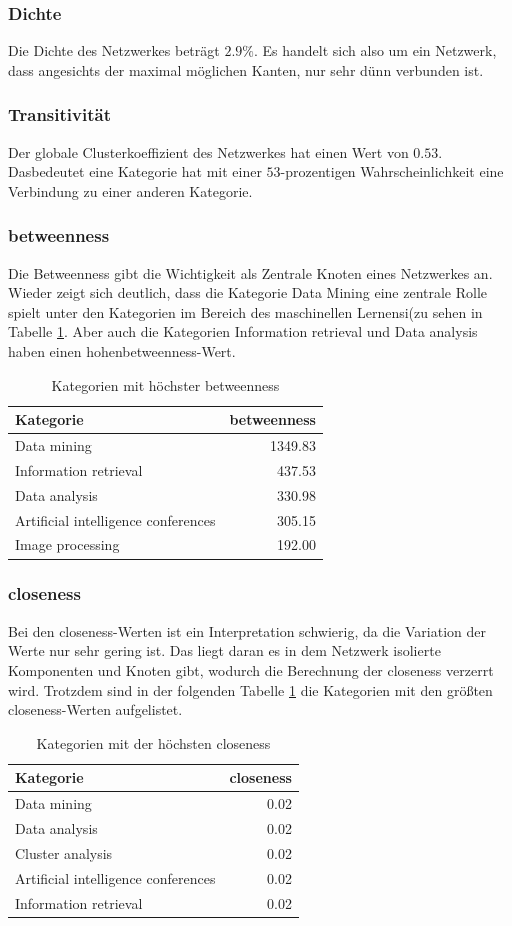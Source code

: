 \documentclass{acm_proc_article-sp}
\begin{document}
\subsubsection{Dichte}
Die Dichte des Netzwerkes beträgt $2.9\%$. Es handelt sich also um ein Netzwerk, dass angesichts der maximal möglichen Kanten, nur sehr dünn verbunden ist.
\subsubsection{Transitivität}
Der globale Clusterkoeffizient des Netzwerkes hat einen Wert von $0.53$. Dasbedeutet eine Kategorie hat mit einer $53$-prozentigen Wahrscheinlichkeit eine Verbindung zu einer anderen Kategorie.
\subsubsection{betweenness}
Die Betweenness gibt die Wichtigkeit als Zentrale Knoten eines Netzwerkes an. Wieder zeigt sich deutlich, dass die Kategorie Data Mining eine zentrale Rolle spielt unter den Kategorien im Bereich des maschinellen Lernensi(zu sehen in Tabelle \ref{tab:close}. Aber auch die Kategorien Information retrieval und Data analysis haben einen hohenbetweenness-Wert.
\begin{table}[H]
\centering
\begin{tabular}{lr}
\hline
Kategorie & betweenness \\ 
\hline
Data mining & 1349.83 \\ 
Information retrieval & 437.53 \\ 
Data analysis & 330.98 \\ 
Artificial intelligence conferences & 305.15 \\ 
Image processing & 192.00 \\ 
\hline
\end{tabular}
\caption{Kategorien mit höchster betweenness}
\label{tab:close}
\end{table}

\subsubsection{closeness}
Bei den closeness-Werten ist ein Interpretation schwierig, da die Variation der Werte nur sehr gering ist. Das liegt daran es in dem Netzwerk isolierte Komponenten und Knoten gibt, wodurch die Berechnung der closeness verzerrt wird. Trotzdem sind in der folgenden Tabelle \ref{tab:close} die Kategorien mit den größten closeness-Werten aufgelistet.
\begin{table}[H]
\centering
\begin{tabular}{lr}
\hline
Kategorie & closeness \\ 
\hline
Data mining & 0.02 \\ 
Data analysis & 0.02 \\ 
Cluster analysis & 0.02 \\ 
Artificial intelligence conferences & 0.02 \\ 
Information retrieval & 0.02 \\ 
\hline
\end{tabular}
\caption{Kategorien mit der höchsten closeness}
\end{table}
\end{document}
